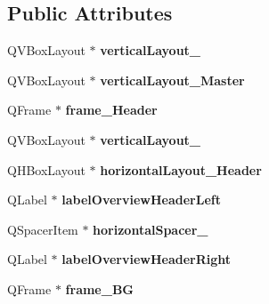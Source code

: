 \subsection*{Public Attributes}
\begin{DoxyCompactItemize}
\item 
\mbox{\label{class_ui___privacy_dialog_a4d7daae906240aa0fba2d31eaec5e97b}} 
Q\+V\+Box\+Layout $\ast$ {\bfseries vertical\+Layout\+\_}
\item 
\mbox{\label{class_ui___privacy_dialog_ace7c131b41ab92c486c12acf6e5291aa}} 
Q\+V\+Box\+Layout $\ast$ {\bfseries vertical\+Layout\+\_\+\+Master}
\item 
\mbox{\label{class_ui___privacy_dialog_a3deabfc7d6b99eb344a5d6035619fef4}} 
Q\+Frame $\ast$ {\bfseries frame\+\_\+\+Header}
\item 
\mbox{\label{class_ui___privacy_dialog_ae43d4ec7e3def1935d319e71e7de68b3}} 
Q\+V\+Box\+Layout $\ast$ {\bfseries vertical\+Layout\+\_}
\item 
\mbox{\label{class_ui___privacy_dialog_a274a7adb7bf5ff302c72c299092027c5}} 
Q\+H\+Box\+Layout $\ast$ {\bfseries horizontal\+Layout\+\_\+\+Header}
\item 
\mbox{\label{class_ui___privacy_dialog_a21692a6ad99142ce6066bcca92923271}} 
Q\+Label $\ast$ {\bfseries label\+Overview\+Header\+Left}
\item 
\mbox{\label{class_ui___privacy_dialog_ae18597e8122723b88b49ccd2e57c5d54}} 
Q\+Spacer\+Item $\ast$ {\bfseries horizontal\+Spacer\+\_}
\item 
\mbox{\label{class_ui___privacy_dialog_a15d89d3b01e407f237cedbd8496ca672}} 
Q\+Label $\ast$ {\bfseries label\+Overview\+Header\+Right}
\item 
\mbox{\label{class_ui___privacy_dialog_a2d028ed0d1600467fe5f111e4b3a3f54}} 
Q\+Frame $\ast$ {\bfseries frame\+\_\+\+BG}
\item 

\end{DoxyCompactItemize}
